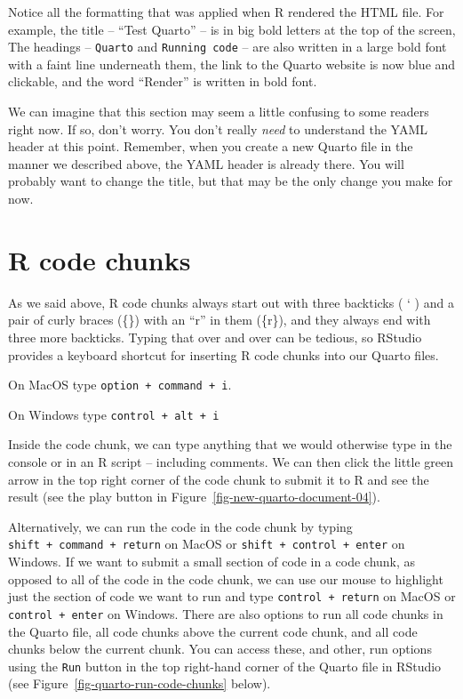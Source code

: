 \documentclass[
  letterpaper,
  DIV=11,
  numbers=noendperiod]{scrreprt}
\begin{document}
Notice all the formatting that was applied when R rendered the HTML
file. For example, the title -- ``Test Quarto'' -- is in big bold
letters at the top of the screen, The headings -- \texttt{Quarto} and
\texttt{Running\ code} -- are also written in a large bold font with a
faint line underneath them, the link to the Quarto website is now blue
and clickable, and the word ``Render'' is written in bold font.

We can imagine that this section may seem a little confusing to some
readers right now. If so, don't worry. You don't really \emph{need} to
understand the YAML header at this point. Remember, when you create a
new Quarto file in the manner we described above, the YAML header is
already there. You will probably want to change the title, but that may
be the only change you make for now.

\section{R code chunks}\label{r-code-chunks}

As we said above, R code chunks always start out with three backticks (
` ) and a pair of curly braces (\{\}) with an ``r'' in them (\{r\}), and
they always end with three more backticks. Typing that over and over can
be tedious, so RStudio provides a keyboard shortcut for inserting R code
chunks into our Quarto files.

On MacOS type \texttt{option\ +\ command\ +\ i}.

On Windows type \texttt{control\ +\ alt\ +\ i}

Inside the code chunk, we can type anything that we would otherwise type
in the console or in an R script -- including comments. We can then
click the little green arrow in the top right corner of the code chunk
to submit it to R and see the result (see the play button in
Figure~\ref{fig-new-quarto-document-04}).

Alternatively, we can run the code in the code chunk by typing
\texttt{shift\ +\ command\ +\ return} on MacOS or
\texttt{shift\ +\ control\ +\ enter} on Windows. If we want to submit a
small section of code in a code chunk, as opposed to all of the code in
the code chunk, we can use our mouse to highlight just the section of
code we want to run and type \texttt{control\ +\ return} on MacOS or
\texttt{control\ +\ enter} on Windows. There are also options to run all
code chunks in the Quarto file, all code chunks above the current code
chunk, and all code chunks below the current chunk. You can access
these, and other, run options using the \texttt{Run} button in the top
right-hand corner of the Quarto file in RStudio (see
Figure~\ref{fig-quarto-run-code-chunks} below).
\end{document}
